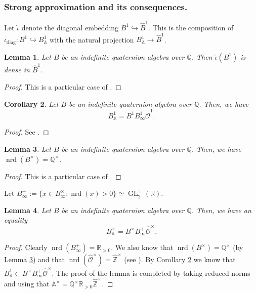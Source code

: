 \documentclass{article}
\newtheorem{lem}{Lemma}[section]
\newtheorem{cor}[lem]{Corollary}
\theoremstyle{named}
\newcommand{\Z}{\mathbb{Z}}
\newcommand{\A}{\mathbb{A}}
\newcommand{\Q}{\mathbb{Q}}
\newcommand{\R}{\mathbb{R}}
\renewcommand{\O}{\mathcal{O}}
\DeclareMathOperator{\GL}{GL}
\DeclareMathOperator{\nrd}{nrd}
\DeclareMathOperator{\diag}{diag}
\begin{document}
\subsubsection{Strong approximation and its consequences.}
Let $\widehat{\iota}$ denote the diagonal embedding $B^1 \hookrightarrow \widehat{B}^1$. This is the composition of $\iota_{\diag}: B^1 \hookrightarrow B_\A^1$ with the natural projection $B_\A^1 \rightarrow \widehat{B}^1$. 
\begin{lem}\label{lem:strongapproxB1general}
Let $B$ be an indefinite quaternion algebra over $\Q$. Then $\widehat{\iota}(B^1)$ is dense in $\widehat{B}^1$.
\end{lem}
\begin{proof}
This is a particular case of \cite[Theorem 28.5.3]{voight}.
\end{proof}

\begin{cor}\label{cor:strongapproxB1}
Let $B$ be an indefinite quaternion algebra over $\Q$. Then, we have 
\begin{equation*}
    B_\A^1 = B^1 B_\infty^1 \widehat{\O}^1.
\end{equation*}
\end{cor}
\begin{proof}
See \cite[Corollary 28.5.12]{voight}.
\end{proof}

\begin{lem}\label{lem:surjectivitynorm}
Let $B$ be an indefinite quaternion algebra over $\Q$. Then, we have $\nrd(B^\times) = \Q^\times$.    
\end{lem}
\begin{proof}
This is a particular case of \cite[Theorem 28.6.1]{voight}.
\end{proof}

Let $B_\infty^+ := \{x \in B_\infty^\times : \nrd(x) > 0\} \simeq \GL_2^+(\R)$.

\begin{lem}\label{lem:strongapproxBtimes}
Let $B$ be an indefinite quaternion algebra over $\Q$. Then, we have an equality
\begin{equation*}
    B_\A^\times = B^\times B_\infty^+\widehat{\O}^\times. 
\end{equation*}
\end{lem}
\begin{proof}
Clearly $\nrd(B_\infty^+) = \R_{> 0}$. We also know that $\nrd(B^\times) = \Q^\times$ (by Lemma \ref{lem:surjectivitynorm}) and that $\nrd(\widehat{\O}^\times) = \widehat{\Z}^\times$ (see \cite[Example 28.5.16]{voight}). By Corollary \ref{cor:strongapproxB1} we know that $B_\A^1 \subset B^\times B_\infty^+ \widehat{\O}^\times$. The proof of the lemma is completed by taking reduced norms and using that $\A^\times = \Q^\times\R_{> 0}\widehat{\Z}^\times$.
\end{proof}
\end{document}
